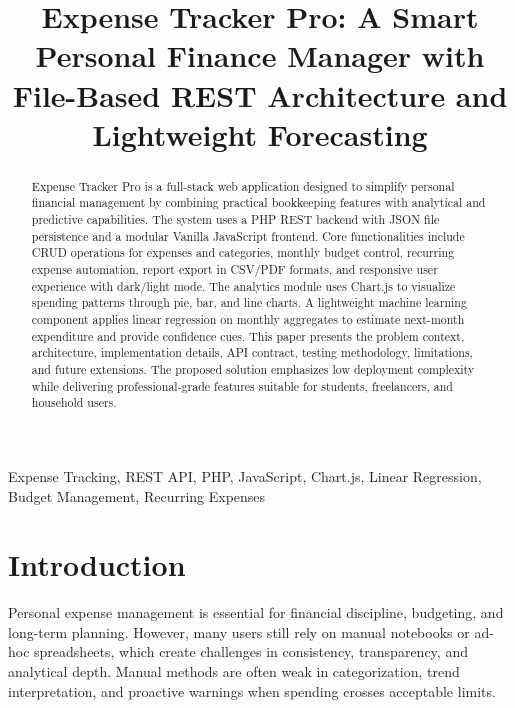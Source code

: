 \documentclass[conference]{IEEEtran}
\begin{document}
\title{Expense Tracker Pro: A Smart Personal Finance Manager with File-Based REST Architecture and Lightweight Forecasting}

\author{
}

\maketitle

\begin{abstract}
Expense Tracker Pro is a full-stack web application designed to simplify personal financial management by combining practical bookkeeping features with analytical and predictive capabilities. The system uses a PHP REST backend with JSON file persistence and a modular Vanilla JavaScript frontend. Core functionalities include CRUD operations for expenses and categories, monthly budget control, recurring expense automation, report export in CSV/PDF formats, and responsive user experience with dark/light mode. The analytics module uses Chart.js to visualize spending patterns through pie, bar, and line charts. A lightweight machine learning component applies linear regression on monthly aggregates to estimate next-month expenditure and provide confidence cues. This paper presents the problem context, architecture, implementation details, API contract, testing methodology, limitations, and future extensions. The proposed solution emphasizes low deployment complexity while delivering professional-grade features suitable for students, freelancers, and household users.
\end{abstract}

\begin{IEEEkeywords}
Expense Tracking, REST API, PHP, JavaScript, Chart.js, Linear Regression, Budget Management, Recurring Expenses
\end{IEEEkeywords}

\section{Introduction}
Personal expense management is essential for financial discipline, budgeting, and long-term planning. However, many users still rely on manual notebooks or ad-hoc spreadsheets, which create challenges in consistency, transparency, and analytical depth. Manual methods are often weak in categorization, trend interpretation, and proactive warnings when spending crosses acceptable limits.
\end{document}
